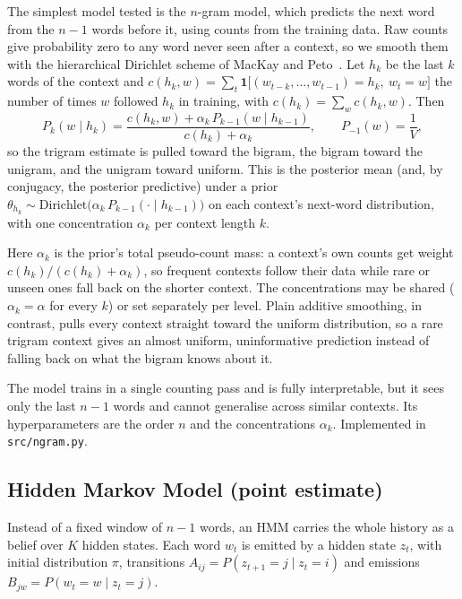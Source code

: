 \documentclass[11pt]{article}
\begin{document}
The simplest model tested is the $n$-gram model, which predicts the next word from the $n-1$ words before it,
using counts from the training data. Raw counts give probability zero to
any word never seen after a context, so we smooth them with the
hierarchical Dirichlet scheme of MacKay and Peto~\cite{mackay1995}. Let
$h_k$ be the last $k$ words of the context and
$c(h_k, w) = \sum_t \mathbf{1}\big[(w_{t-k}, \dots, w_{t-1}) = h_k,\ w_t = w\big]$
the number of times $w$ followed $h_k$ in training, with
$c(h_k) = \sum_w c(h_k, w)$. Then
\[
P_k(w \mid h_k) = \frac{c(h_k, w) + \alpha_k\, P_{k-1}(w \mid h_{k-1})}
{c(h_k) + \alpha_k}, \qquad P_{-1}(w) = \frac{1}{V},
\]
so the trigram estimate is pulled toward the bigram, the bigram toward the
unigram, and the unigram toward uniform. This is the posterior mean (and,
by conjugacy, the posterior predictive) under a prior
$\theta_{h_k} \sim \text{Dirichlet}\big(\alpha_k\, P_{k-1}(\cdot \mid
h_{k-1})\big)$ on each context's next-word distribution, with one
concentration $\alpha_k$ per context length $k$.

Here $\alpha_k$ is the prior's total pseudo-count mass: a context's own
counts get weight $c(h_k)/(c(h_k) + \alpha_k)$, so frequent contexts follow
their data while rare or unseen ones fall back on the shorter context.
The concentrations may be shared ($\alpha_k = \alpha$ for every $k$) or
set separately per level.
Plain additive smoothing, in contrast, pulls every context straight
toward the uniform distribution, so a rare trigram context gives an
almost uniform, uninformative prediction instead of falling back on
what the bigram knows about it.

The model trains in a single counting pass and is fully interpretable,
but it sees only the last $n-1$ words and cannot generalise across
similar contexts. Its hyperparameters are the order $n$ and the
concentrations $\alpha_k$. Implemented in \texttt{src/ngram.py}.

\subsection{Hidden Markov Model (point estimate)}

Instead of a fixed window of $n-1$ words, an HMM\cite{rabiner1989} carries the whole
history as a belief over $K$ hidden states. Each word $w_t$ is emitted by
a hidden state $z_t$, with initial distribution $\pi$, transitions
$A_{ij} = P(z_{t+1} = j \mid z_t = i)$ and emissions
$B_{jw} = P(w_t = w \mid z_t = j)$.
\end{document}
